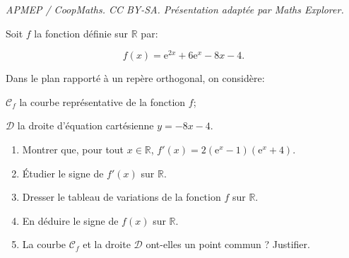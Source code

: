 \documentclass[10pt]{article}
\providecommand{\R}{\mathbb{R}}
\providecommand{\e}{{\mathrm{e}}}
\begin{document}
\noindent\textit{APMEP / CoopMaths. CC BY-SA. Présentation adaptée par Maths Explorer.}\par\medskip
\bigskip

Soit $f$ la fonction définie sur $\R$ par: 

\[f(x)=\e^{2x} + 6 \e^{x} - 8x-4.\]

\begin{list}{\textbullet}{Dans le plan rapporté à un repère orthogonal, on considère:}
\item $\mathcal{C}_f$ la courbe représentative de la fonction $f$;
\item $\mathcal{D}$ la droite d'équation cartésienne $y=-8x-4$.
\end{list}

\medskip

\begin{enumerate}
\item Montrer que, pour tout $x \in \R$, $f'(x)=2\left (\e^{x}-1\right )\left (\e^{x}+4\right )$.
\item Étudier le signe de $f'(x)$ sur $\R$.
\item Dresser le tableau de variations de la fonction $f$ sur $\R$.
\item En déduire le signe de $f(x)$ sur $\R$.
\item La courbe $\mathcal{C}_f$ et la droite $\mathcal{D}$ ont-elles un point commun ? Justifier.
\end{enumerate}
\end{document}
